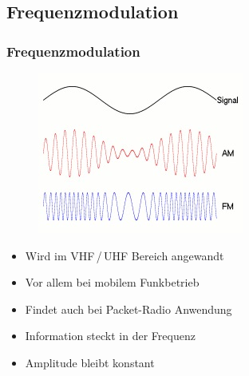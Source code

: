 \subsection[FM]{Frequenzmodulation}
\begin{frame}
\frametitle{Frequenzmodulation}
	\begin{center}
    \begin{figure}
      \includegraphics[width=\textwidth,height=.75\textheight,keepaspectratio]{e14/modulationen.jpg}
    \end{figure}
	\begin{itemize}
		\item Wird im VHF\,/\,UHF Bereich angewandt
		\item Vor allem bei mobilem Funkbetrieb
		\item Findet auch bei Packet-Radio Anwendung
		\item Information steckt in der Frequenz
		\item Amplitude bleibt konstant
	\end{itemize}
	\end{center}
\end{frame}


